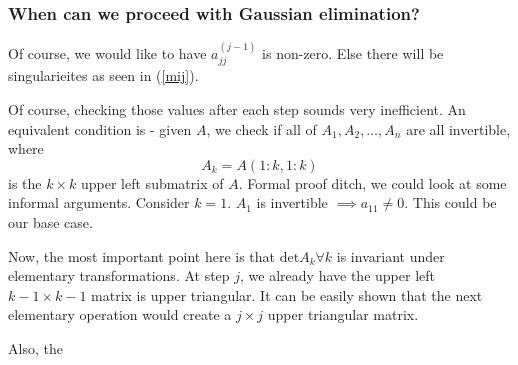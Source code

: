 \documentclass[a4paper]{article}
\begin{document}
\subsubsection*{When can we proceed with Gaussian elimination?}
Of course, we would like to have $a_{jj}^{(j-1)}$ is non-zero.
Else there will be singularieites as seen in (\ref{mij}).

Of course, checking those values after each step sounds
very inefficient. An equivalent condition is - given $A$, we check
if all of $A_1, A_2, \ldots, A_{n}$ are all invertible, where
\[
	A_k = A(1:k, 1:k)
\] 
is the $k\times k$ upper left submatrix of $A$. Formal proof ditch,
we could look at some informal arguments. Consider  $ k = 1$.
$A_1$ is invertible $\implies a_{11} \neq  0$. This could be our base
case.

Now, the most important point here is that $\text{det}A_k \forall k$ 
is invariant under elementary transformations.
At step $j$, we already have the upper left $k-1 \times  k-1$ matrix
is upper triangular. It can be easily shown that the next elementary
operation would create a $j \times  j$ upper triangular matrix.

Also, the 


\end{document}
